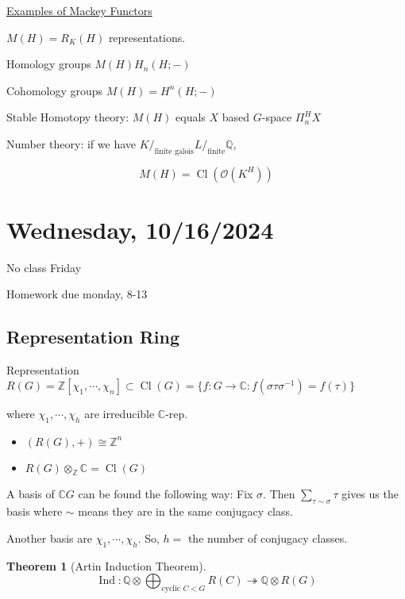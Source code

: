 \documentclass{article}
\theoremstyle{definition}
\newtheorem{theorem}{Theorem}
\begin{document}
\underline{Examples of Mackey Functors} 

\(M(H)=R_K(H)\) representations.

Homology groups \(M(H)  H_n(H;-)\) 

Cohomology groups \(M(H)=H^n(H;-)\) 

Stable Homotopy theory: \(M(H)\) equals \(X\) based \(G\)-space \(\Pi^H_n X\)

Number theory: if we have \(K /_{\text{finite galois}} L /_{\text{finite}} \mathbb{Q}\),

\[
    M(H) = \operatorname{Cl}(\mathcal{O}(K^H))
\]

\section*{Wednesday, 10/16/2024}

No class Friday

Homework due monday, 8-13

\subsection*{Representation Ring}

Representation \(R(G) = \mathbb{Z}[\chi_1, \cdots , \chi_n] \subset \operatorname{Cl}(G) = \{ f: G\to \mathbb{C} : f(\sigma \tau \sigma ^{-1}) = f(\tau) \} \)

where \(\chi_1, \cdots , \chi_h\) are irreducible \(\mathbb{C}\)-rep.

\begin{itemize}
    \item \((R(G),+) \cong \mathbb{Z}^n\) 
    \item \(R(G) \otimes _\mathbb{Z} \mathbb{C} = \operatorname{Cl}(G)\)  
\end{itemize} 

A basis of \(\mathbb{C} G\) can be found the following way: Fix \(\sigma\). Then \(\sum_{\tau \sim \sigma} \tau\) gives us the basis where \(\sim\) means they are in the same conjugacy class.

Another basis are \(\chi_1, \cdots , \chi_h\). So, \(h=\) the number of conjugacy classes.

\begin{theorem}
    [Artin Induction Theorem]

    \[
        \operatorname{Ind} : \mathbb{Q} \otimes \bigoplus_{\text{cyclic } C < G} R(C) \twoheadrightarrow \mathbb{Q} \otimes R(G)
    \]
\end{theorem}
\end{document}
